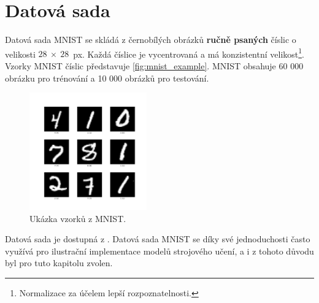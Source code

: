 \newpage
\section{Datová sada}
\label{sec:mnist}
Datová sada MNIST se skládá z černobílých obrázků \textbf{ručně psaných} číslic o velikosti $28~\times~28$~px.
Každá číslice je vycentrovaná a má konzistentní velikost\footnote{Normalizace za účelem lepší rozpoznatelnosti.}.
Vzorky MNIST číslic představuje \autoref{fig:mnist_example}.
MNIST obsahuje 60 000 obrázku pro trénování a 10 000 obrázků pro testování.

\begin{figure}[H]
    \centering
    \includegraphics[width=0.45\textwidth]{figures/mnist_example.png}
    \caption{Ukázka vzorků z MNIST.}
    \label{fig:mnist_example}
\end{figure}

Datová sada je dostupná z \textcite{LeCun2010}. Datová sada MNIST se díky své jednoduchosti často využívá pro ilustrační implementace modelů strojového učení, a i z tohoto důvodu byl pro tuto kapitolu zvolen.
